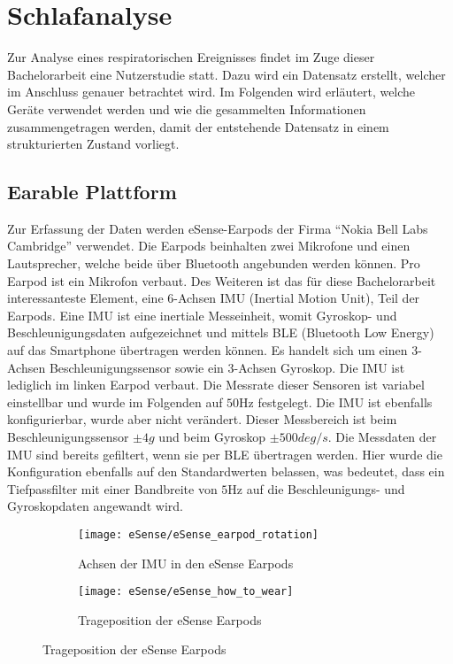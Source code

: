 
\chapter{Schlafanalyse}
\label{ch:sa}
Zur Analyse eines respiratorischen Ereignisses findet im Zuge dieser Bachelorarbeit eine Nutzerstudie statt. 
Dazu wird ein Datensatz erstellt, welcher im Anschluss genauer betrachtet wird. 
Im Folgenden wird erläutert, welche Geräte verwendet werden und wie die gesammelten Informationen zusammengetragen werden, damit der entstehende Datensatz in einem strukturierten Zustand vorliegt.

\section{Earable Plattform}
\label{ch:sa:ep}
Zur Erfassung der Daten werden eSense-Earpods der Firma ``Nokia Bell Labs Cambridge'' verwendet.	
Die Earpods beinhalten zwei Mikrofone und einen Lautsprecher, welche beide über Bluetooth angebunden werden können.
Pro Earpod ist ein Mikrofon verbaut.
Des Weiteren ist das für diese Bachelorarbeit interessanteste Element, eine 6-Achsen IMU (Inertial Motion Unit), Teil der Earpods.
Eine IMU ist eine inertiale Messeinheit, womit Gyroskop- und Beschleunigungsdaten aufgezeichnet und mittels BLE (Bluetooth Low Energy) auf das Smartphone übertragen werden können. 
Es handelt sich um einen 3-Achsen Beschleunigungssensor sowie ein 3-Achsen Gyroskop.
Die IMU ist lediglich im linken Earpod verbaut.
Die Messrate dieser Sensoren ist variabel einstellbar und wurde im Folgenden auf $50 \si{\hertz}$ festgelegt.
Die IMU ist ebenfalls konfigurierbar, wurde aber nicht verändert. 
Dieser Messbereich ist beim Beschleunigungssensor $\pm 4g$ und beim Gyroskop $\pm 500deg/s$.
Die Messdaten der IMU sind bereits gefiltert, wenn sie per BLE übertragen werden.
Hier wurde die Konfiguration ebenfalls auf den Standardwerten belassen, was bedeutet, dass ein Tiefpassfilter mit einer Bandbreite von $5\si{\hertz}$ auf die Beschleunigungs- und Gyroskopdaten angewandt wird.

\begin{figure}[ht]
    \centering
    \begin{subfigure}{.49\textwidth}
      \texttt{[image: eSense/eSense\_earpod\_rotation]}
      \caption{Achsen der IMU in den eSense Earpods}
      \label{analysis:eSense:rotation}
    \end{subfigure}
    \begin{subfigure}{.49\textwidth}
      \texttt{[image: eSense/eSense\_how\_to\_wear]}
      \caption{Trageposition der eSense Earpods}
      \label{analysis:eSense:how_to_wear}
    \end{subfigure}
    \label{analysis:eSense:images}
  \end{figure}

